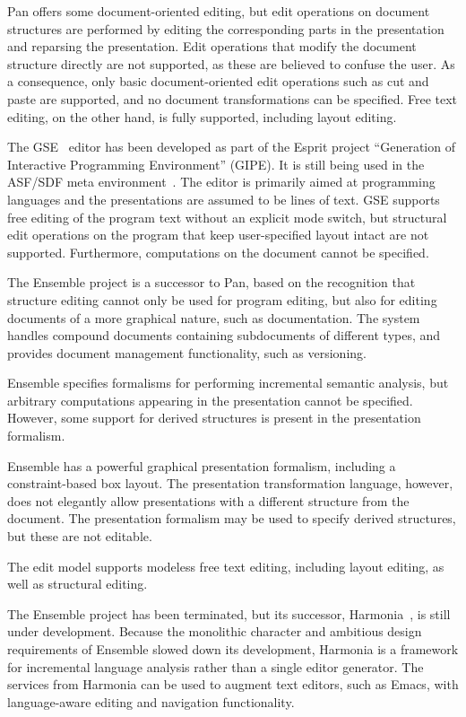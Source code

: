 Pan offers some document-oriented editing, but edit operations on document structures are performed by editing the corresponding parts in the presentation and reparsing the presentation. Edit operations that modify the document structure directly are not supported, as these are believed to confuse the user. As a consequence, only basic document-oriented edit operations such as cut and paste are supported, and no document transformations can be specified. Free text editing, on the other hand, is fully supported, including layout editing. 


The GSE~\cite{koorn92gse} editor has been developed as part of the Esprit project ``Generation of Interactive Programming Environment'' (GIPE). It is still being used in the ASF/SDF meta environment~\cite{klint93asfsdf}. The editor is primarily aimed at programming languages and the presentations are assumed to be lines of text. GSE supports free editing of the program text without an explicit mode switch, but structural edit operations on the program that keep user-specified layout intact are not supported. Furthermore, computations on the document cannot be specified.


The Ensemble project is a successor to Pan, based on the recognition that structure editing cannot only be used for program editing, but also for editing documents of a more graphical nature, such as documentation. The system handles compound documents containing subdocuments of different types, and provides document management functionality, such as versioning.

Ensemble specifies formalisms for performing incremental semantic analysis, but arbitrary computations appearing in the presentation cannot be specified. However, some support for derived structures is present in the presentation formalism.

Ensemble has a powerful graphical presentation formalism, including a constraint-based box layout. The presentation transformation language, however, does not elegantly allow presentations with a different structure from the document. The presentation formalism may be used to specify derived structures, but these are not editable.

The edit model supports modeless free text editing, including layout editing, as well as structural editing.

The Ensemble project has been terminated, but its successor, Harmonia~\cite{boshernitsan01harmonia}, is still under development. Because the monolithic character and ambitious design requirements of Ensemble slowed down its development, Harmonia is a framework for incremental language analysis rather than a single editor generator. The services from Harmonia can be used to augment text editors, such as Emacs, with language-aware editing and navigation functionality.

